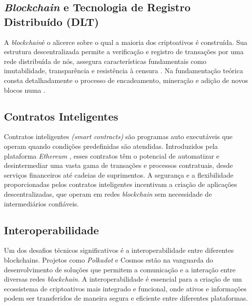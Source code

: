 \documentclass[article,12pt,oneside,a4paper,english,brazil]{unifil}
\begin{document}
\begin{Spacing}{1.5}
\subsection*{\textit{Blockchain} e Tecnologia de Registro Distribuído (DLT)}
A \textit{blockchain}é o alicerce sobre o qual a maioria dos criptoativos é construída. Sua estrutura descentralizada  permite a verificação e registro de transações por uma rede distribuída de nós, assegura características fundamentais como imutabilidade, transparência e resistência à censura \cite{Nakamoto2009}. Na fundamentação teórica consta detalhadamente o processo de encadeamento, mineração e adição de novos blocos numa .

\subsection*{Contratos Inteligentes}

Contratos inteligentes \textit{(smart contracts)} são programas auto executáveis que operam quando condições predefinidas são atendidas. Introduzidos pela plataforma \textit{Ethereum} \cite{buterin2013ethereum}, esses contratos têm o potencial de automatizar e desintermediar uma vasta gama de transações e processos contratuais, desde serviços financeiros até cadeias de suprimentos. A segurança e a flexibilidade proporcionadas pelos contratos inteligentes incentivam a criação de aplicações descentralizadas, que operam em redes \textit{blockchain} sem necessidade de intermediários confiáveis.

\subsection*{Interoperabilidade}

Um dos desafios técnicos significativos é a interoperabilidade entre diferentes blockchains. Projetos como \textit{Polkadot} \cite{wood2016polkadot} e Cosmos \cite{kwon2016cosmos} estão na vanguarda do desenvolvimento de soluções que permitem a comunicação e a interação entre diversas redes \textit{blockchain}. A interoperabilidade é essencial para a criação de um ecossistema de criptoativos mais integrado e funcional, onde ativos e informações podem ser transferidos de maneira segura e eficiente entre diferentes plataformas.


\end{Spacing}
\end{document}
